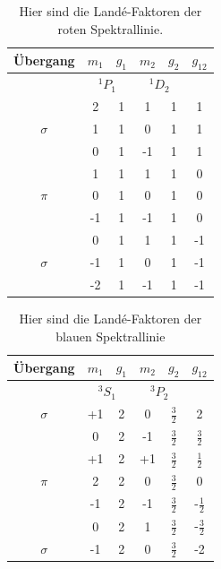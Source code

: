 


\begin{table}
	\centering
	\begin{tabular}{cccccc}
		\toprule
		Übergang & $m_1$  & $g_{1}$ & $m_2$ & $ g_2$ & $g_{12}$\\
		\midrule
		& \multicolumn{2}{c}{${}^1P_1$}  & \multicolumn{2}{c}{${}^1D_2$} \\
		\midrule
		& 2 & 1 & 1 & 1 & 1\\
		$\sigma$& 1 & 1 & 0 & 1 & 1\\
		& 0 & 1 & -1 & 1 & 1\\
		\midrule
		& 1 & 1 & 1 & 1 & 0\\
		$\pi$ & 0 & 1 & 0 & 1 & 0\\
		& -1 & 1 & -1 & 1 & 0\\
		\midrule
		& 0 & 1 & 1 & 1 & -1\\
		$\sigma$ & -1 & 1 & 0 & 1 & -1\\
		& -2 & 1 & -1 & 1 & -1\\\bottomrule
	\end{tabular}
	\caption{Hier sind die Landé-Faktoren der roten Spektrallinie.}
	\label{tab:Lande_rot}
\end{table}
\begin{table}
	\centering
	\begin{tabular}{cccccc}
		\toprule
		Übergang & $m_1$  & $g_{1}$ & $m_2$ & $ g_2$ & $g_{12}$\\
		\midrule
		& \multicolumn{2}{c}{${}^3S_1$}  & \multicolumn{2}{c}{${}^3P_2$} \\
		\midrule
		$\sigma$ & +1 & 2 & 0 & $\frac{3}{2}$& 2\\
		& 0 & 2 & -1 & $\frac{3}{2}$ & $\frac{3}{2}$\\
		\midrule
		& +1 & 2 & +1 & $\frac{3}{2}$ & $\frac{1}{2}$\\
		$\pi$ & 2 & 2 & 0 & $\frac{3}{2}$ & 0 \\
		& -1 & 2 & -1 & $\frac{3}{2}$ & -$\frac{1}{2}$\\
		\midrule
		& 0 & 2 & 1 & $\frac{3}{2}$ & -$\frac{3}{2}$\\
		$\sigma$ & -1 & 2 & 0 & $\frac{3}{2}$& -2\\
		\bottomrule
	\end{tabular}
	\caption{Hier sind die Landé-Faktoren der blauen Spektrallinie}
	\label{tab:Lande_blau}
\end{table}